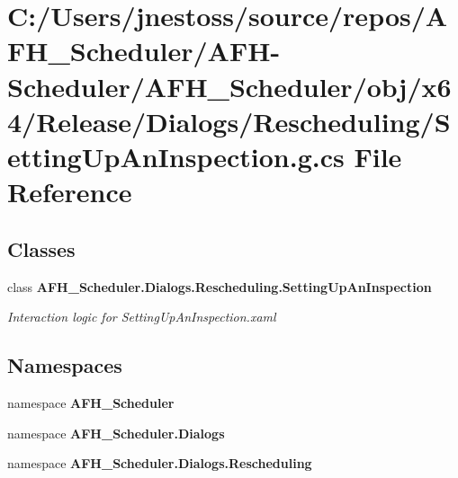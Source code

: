 \section{C\+:/\+Users/jnestoss/source/repos/\+A\+F\+H\+\_\+\+Scheduler/\+A\+F\+H-\/\+Scheduler/\+A\+F\+H\+\_\+\+Scheduler/obj/x64/\+Release/\+Dialogs/\+Rescheduling/\+Setting\+Up\+An\+Inspection.g.\+cs File Reference}
\label{x64_2_release_2_dialogs_2_rescheduling_2_setting_up_an_inspection_8g_8cs}
\subsection*{Classes}
\begin{DoxyCompactItemize}
\item 
class \textbf{ A\+F\+H\+\_\+\+Scheduler.\+Dialogs.\+Rescheduling.\+Setting\+Up\+An\+Inspection}
\begin{DoxyCompactList}\small\item\em Interaction logic for Setting\+Up\+An\+Inspection.\+xaml \end{DoxyCompactList}\end{DoxyCompactItemize}
\subsection*{Namespaces}
\begin{DoxyCompactItemize}
\item 
namespace \textbf{ A\+F\+H\+\_\+\+Scheduler}
\item 
namespace \textbf{ A\+F\+H\+\_\+\+Scheduler.\+Dialogs}
\item 
namespace \textbf{ A\+F\+H\+\_\+\+Scheduler.\+Dialogs.\+Rescheduling}
\end{DoxyCompactItemize}

